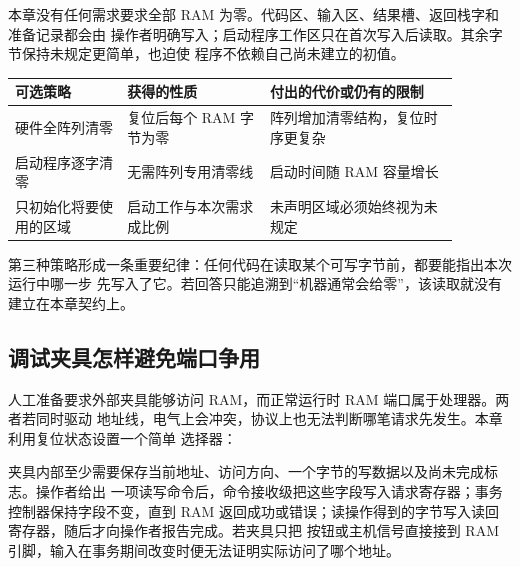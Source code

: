 本章没有任何需求要求全部 RAM 为零。代码区、输入区、结果槽、返回栈字和准备记录都会由
操作者明确写入；启动程序工作区只在首次写入后读取。其余字节保持未规定更简单，也迫使
程序不依赖自己尚未建立的初值。

\begin{longtable}{|L{0.22\linewidth}|L{0.29\linewidth}|L{0.37\linewidth}|}
\hline
{}
可选策略 & 获得的性质 & 付出的代价或仍有的限制 \\ \hline
硬件全阵列清零 & 复位后每个 RAM 字节为零 & 阵列增加清零结构，复位时序更复杂 \\ \hline
启动程序逐字清零 & 无需阵列专用清零线 & 启动时间随 RAM 容量增长 \\ \hline
只初始化将要使用的区域 & 启动工作与本次需求成比例 & 未声明区域必须始终视为未规定 \\ \hline
\end{longtable}

第三种策略形成一条重要纪律：任何代码在读取某个可写字节前，都要能指出本次运行中哪一步
先写入了它。若回答只能追溯到“机器通常会给零”，该读取就没有建立在本章契约上。

\subsection{调试夹具怎样避免端口争用}

人工准备要求外部夹具能够访问 RAM，而正常运行时 RAM 端口属于处理器。两者若同时驱动
地址线，电气上会冲突，协议上也无法判断哪笔请求先发生。本章利用复位状态设置一个简单
选择器：

夹具内部至少需要保存当前地址、访问方向、一个字节的写数据以及尚未完成标志。操作者给出
一项读写命令后，命令接收级把这些字段写入请求寄存器；事务控制器保持字段不变，直到 RAM
返回成功或错误；读操作得到的字节写入读回寄存器，随后才向操作者报告完成。若夹具只把
按钮或主机信号直接接到 RAM 引脚，输入在事务期间改变时便无法证明实际访问了哪个地址。

